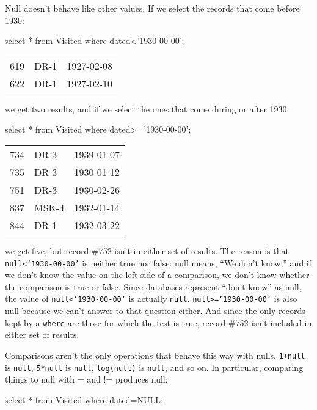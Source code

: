 \documentclass{book}
\begin{document}
Null doesn't behave like other values. If we select the records that
come before 1930:

\begin{VerbIn}
select * from Visited where dated<'1930-00-00';
\end{VerbIn}

\begin{tabular}{lll}
619 & DR-1 & 1927-02-08 \\
622 & DR-1 & 1927-02-10 \\
\end{tabular}

we get two results, and if we select the ones that come during or after
1930:

\begin{VerbIn}
select * from Visited where dated>='1930-00-00';
\end{VerbIn}

\begin{tabular}{lll}
734 & DR-3 & 1939-01-07 \\
735 & DR-3 & 1930-01-12 \\
751 & DR-3 & 1930-02-26 \\
837 & MSK-4 & 1932-01-14 \\
844 & DR-1 & 1932-03-22 \\
\end{tabular}

we get five, but record \#752 isn't in either set of results. The reason
is that \texttt{null\textless{}'1930-00-00'} is neither true nor false:
null means, ``We don't know,'' and if we don't know the value on the
left side of a comparison, we don't know whether the comparison is true
or false. Since databases represent ``don't know'' as null, the value of
\texttt{null\textless{}'1930-00-00'} is actually \texttt{null}.
\texttt{null\textgreater{}='1930-00-00'} is also null because we can't
answer to that question either. And since the only records kept by a
\texttt{where} are those for which the test is true, record \#752 isn't
included in either set of results.

Comparisons aren't the only operations that behave this way with nulls.
\texttt{1+null} is \texttt{null}, \texttt{5*null} is \texttt{null},
\texttt{log(null)} is \texttt{null}, and so on. In particular, comparing
things to null with = and != produces null:

\begin{VerbIn}
select * from Visited where dated=NULL;
\end{VerbIn}
\end{document}
